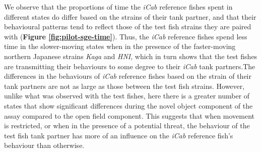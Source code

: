 \documentclass[
]{book}
\begin{document}
We observe that the proportions of time the \emph{iCab} reference fishes spent in different states do differ based on the strains of their tank partner, and that their behavioural patterns tend to reflect those of the test fish strains they are paired with (\textbf{Figure \ref{fig:pilot-sge-time}}). Thus, the \emph{iCab} reference fishes spend less time in the slower-moving states when in the presence of the faster-moving northern Japanese strains \emph{Kaga} and \emph{HNI}, which in turn shows that the test fishes are transmitting their behaviours to some degree to their \emph{iCab} tank partners.The differences in the behaviours of \emph{iCab} reference fishes based on the strain of their tank partners are not as large as those between the test fish strains. However, unlike what was observed with the test fishes, here there is a greater number of states that show significant differences during the novel object component of the assay compared to the open field component. This suggests that when movement is restricted, or when in the presence of a potential threat, the behaviour of the test fish tank partner has more of an influence on the \emph{iCab} reference fish's behaviour than otherwise.
\end{document}
